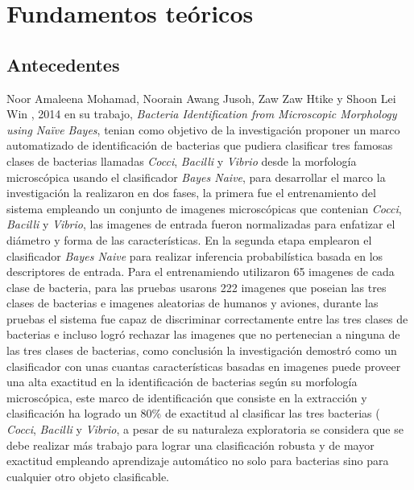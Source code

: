 \chapter{Fundamentos te\'oricos}

\section{Antecedentes}

 Noor Amaleena Mohamad, Noorain Awang Jusoh, Zaw Zaw Htike y Shoon
Lei Win , 2014 en su trabajo,  \textit{ Bacteria Identification from Microscopic Morphology using Naïve Bayes}, tenian como  objetivo de la investigación  proponer un marco automatizado de identificación de bacterias que pudiera clasificar tres famosas clases de bacterias llamadas  \textit{Cocci}, \textit{Bacilli} y  \textit{Vibrio} desde la morfología microscópica usando el clasificador \textit{Bayes Naive}, para desarrollar el marco la investigación la realizaron en dos fases, la primera fue el entrenamiento del sistema empleando un  conjunto de imagenes microscópicas que contenian  \textit{Cocci},  \textit{Bacilli} y  \textit{Vibrio}, las imagenes de entrada fueron normalizadas para enfatizar el diámetro y forma de las características. En la segunda etapa emplearon el clasificador \textit{Bayes Naive} para realizar inferencia probabilística basada en los descriptores de entrada. Para el entrenamiendo  utilizaron 65 imagenes de cada clase de bacteria, para las pruebas usarons 222 imagenes que poseian las tres clases de bacterias e imagenes aleatorias de humanos y aviones, durante las pruebas el sistema fue capaz de discriminar correctamente entre las tres clases de bacterias e incluso logró rechazar las imagenes que no pertenecian a ninguna de las tres clases de bacterias, como conclusión la investigación demostró como un clasificador con unas cuantas características basadas en imagenes puede proveer una alta exactitud en la identificación de bacterias según su morfología microscópica, este marco de identificación que consiste en la extracción y clasificación ha logrado un 80\% de exactitud al clasificar las tres bacterias ( \textit{Cocci},  \textit{Bacilli} y  \textit{Vibrio}, a pesar de su naturaleza exploratoria se considera que se debe realizar más trabajo para lograr una clasificación robusta y de mayor exactitud empleando aprendizaje automático no solo para bacterias sino para cualquier otro objeto clasificable.\\

